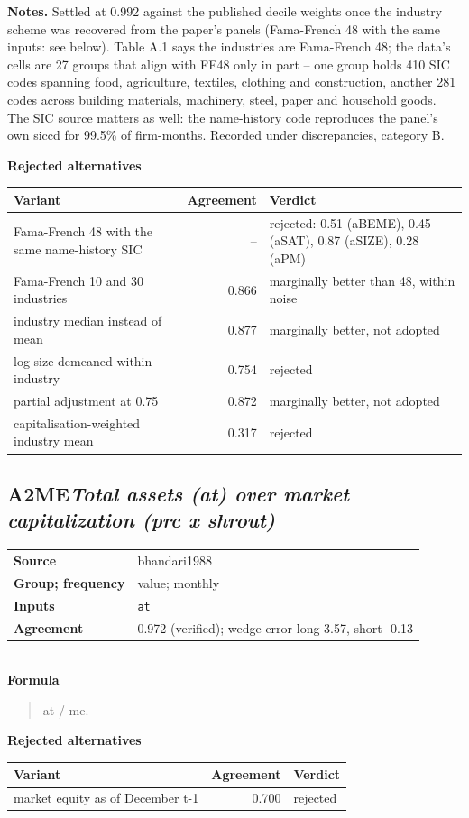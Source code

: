 \documentclass[11pt]{article}
\begin{document}
\textbf{Notes.} Settled at 0.992 against the published decile weights once the industry scheme was recovered from the paper's panels (Fama-French 48 with the same inputs: see below). Table A.1 says the industries are Fama-French 48; the data's cells are 27 groups that align with FF48 only in part -- one group holds 410 SIC codes spanning food, agriculture, textiles, clothing and construction, another 281 codes across building materials, machinery, steel, paper and household goods. The SIC source matters as well: the name-history code reproduces the panel's own siccd for 99.5\% of firm-months. Recorded under discrepancies, category B.

\textbf{Rejected alternatives}\\[2pt]
{\small\begin{longtable}{@{}p{9.6cm}rp{4.3cm}@{}}
\toprule Variant & Agreement & Verdict\\\midrule\endhead
Fama-French 48 with the same name-history SIC & -- & rejected: 0.51 (aBEME), 0.45 (aSAT), 0.87 (aSIZE), 0.28 (aPM)\\
Fama-French 10 and 30 industries & 0.866 & marginally better than 48, within noise\\
industry median instead of mean & 0.877 & marginally better, not adopted\\
log size demeaned within industry & 0.754 & rejected\\
partial adjustment at 0.75 & 0.872 & marginally better, not adopted\\
capitalisation-weighted industry mean & 0.317 & rejected\\
\bottomrule\end{longtable}}
\subsection*{A2ME\quad\normalfont\itshape Total assets (at) over market capitalization (prc x shrout)}
\begin{tabular}{@{}p{3.3cm}p{12.3cm}@{}}
\textbf{Source} & bhandari1988\\
\textbf{Group; frequency} & value; monthly\\
\textbf{Inputs} & \texttt{at}\\
\textbf{Agreement} & 0.972 (verified); wedge error long 3.57, short -0.13\\
\end{tabular}\\[4pt]
\textbf{Formula}
\begin{quote}\small
at / me.\\

\end{quote}
\textbf{Rejected alternatives}\\[2pt]
{\small\begin{longtable}{@{}p{9.6cm}rp{4.3cm}@{}}
\toprule Variant & Agreement & Verdict\\\midrule\endhead
market equity as of December t-1 & 0.700 & rejected\\
\bottomrule\end{longtable}}
\end{document}
